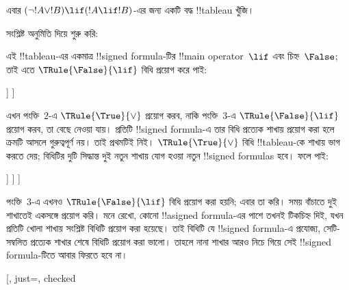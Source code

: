 \documentclass[../../../include/open-logic-section]{subfiles}
\begin{document}
\begin{ex}
এবার $(\lnot !A \lor !B) \lif (!A \lif !B)$-এর জন্য একটি বদ্ধ
!!{tableau} খুঁজি।

সংশ্লিষ্ট অনুমিতি দিয়ে শুরু করি:
\begin{oltableau}
  [\sFmla{\False}{(\lnot \formula{A} \lor \formula{B}) \lif
      (\formula{A} \lif \formula{B})}, just=\TAss]
\end{oltableau}
এই !!{tableau}-এর একমাত্র !!{signed formula}-টির
!!{main operator}~$\lif$ এবং চিহ্ন~$\False$; তাই এতে
$\TRule{\False}{\lif}$ বিধি প্রয়োগ করে পাই:
\begin{oltableau}
  [\sFmla{\False}{(\lnot \formula{A} \lor \formula{B})
      \lif (\formula{A} \lif \formula{B})}, just=\TAss, checked
    [\sFmla{\True}{\lnot \formula{A} \lor \formula{B}},
      just={\TRule{\False}{\lif}[1]}
      [\sFmla{\False}{(\formula{A} \lif \formula{B})},
        just={\TRule{\False}{\lif}[1]}
      ]
    ]
  ]
\end{oltableau}
এখন পংক্তি~$2$-এ $\TRule{\True}{\lor}$ প্রয়োগ করব, নাকি
পংক্তি~$3$-এ $\TRule{\False}{\lif}$ প্রয়োগ করব, তা বেছে নেওয়া যায়।
প্রতিটি !!{signed formula}-এ তার বিধি প্রত্যেক শাখায় প্রয়োগ করা হলে
ক্রমটি আসলে গুরুত্বপূর্ণ নয়। তাই প্রথমটিই নিই। $\TRule{\True}{\lor}$
বিধি !!{tableau}-কে শাখায় ভাগ করতে দেয়; বিধিটির দুটি সিদ্ধান্ত দুই
নতুন শাখায় যোগ হওয়া নতুন !!{signed formula}s হবে। ফলে পাই:
\begin{oltableau}
  [\sFmla{\False}{(\lnot \formula{A} \lor \formula{B}) \lif
      (\formula{A} \lif \formula{B})}, just=\TAss, checked
    [\sFmla{\True}{\lnot \formula{A} \lor \formula{B}},
      just={\TRule{\False}{\lif}[1]}, checked
      [\sFmla{\False}{(\formula{A} \lif \formula{B})},
        just={\TRule{\False}{\lif}[1]}
        [\sFmla{\True}{\lnot \formula{A}}, just={\TRule{\True}{\lor}[2]}]
        [\sFmla{\True}{\formula{B}}, just={\TRule{\True}{\lor}[2]}]
      ]
    ]
  ]
\end{oltableau}
পংক্তি~$3$-এ এখনও $\TRule{\False}{\lif}$ বিধি প্রয়োগ করা হয়নি;
এবার তা করি। সময় বাঁচাতে দুই শাখাতেই একসঙ্গে প্রয়োগ করি।
মনে রেখো, কোনো !!a{signed formula}-এর পাশে তখনই টিকচিহ্ন দিই, যখন
প্রতিটি খোলা শাখায় সংশ্লিষ্ট বিধিটি প্রয়োগ করা হয়েছে। তাই বিধিটি
যে !!{signed formula}-এ প্রযোজ্য, সেটি-সম্বলিত প্রত্যেক শাখার শেষে
বিধিটি প্রয়োগ করা ভালো। তাহলে নানা শাখার আরও নিচে গিয়ে সেই
!!{signed formula}-টিতে আবার ফিরতে হবে না।
\begin{oltableau}
  [, just=\TAss, checked

\end{oltableau}
\end{ex}
\end{document}
